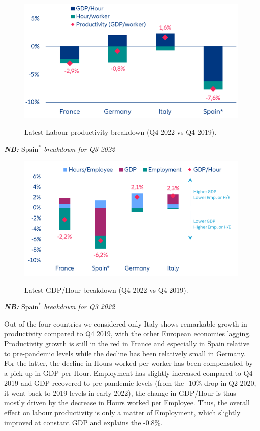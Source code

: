 \begin{figure}[H]
    \centering
    \caption{Latest Labour productivity breakdown (Q4 2022 vs Q4 2019).}
    \includegraphics[width=.5\textwidth]{Core/2.Labour/img/prodbreakdown1.png}
    \label{figure:prodbreakdown1}
\end{figure}
\vspace{-.5cm}
\quad \quad \quad \quad \quad \quad \quad \textit{\textbf{NB:} $\textrm{Spain}^{*}$ breakdown for Q3 2022}
\begin{figure}[H]
    \centering
    \caption{Latest GDP/Hour breakdown (Q4 2022 vs Q4 2019).}
    \includegraphics[width=.5\textwidth]{Core/2.Labour/img/prodbreakdown2.png}
    \label{figure:prodbreakdown2}
\end{figure}
\vspace{-.5cm}
\quad \quad \quad \quad \quad \quad \quad \textit{\textbf{NB:} $\textrm{Spain}^{*}$ breakdown for Q3 2022}

Out of the four countries we considered only Italy shows remarkable growth in productivity compared to Q4 2019, with the other European economies lagging. 
Productivity growth is still in the red in France and especially in Spain relative to pre-pandemic levels while the decline has been relatively small in Germany. 
For the latter, the decline in Hours worked per worker has been compensated by a pick-up in GDP per Hour. 
Employment has slightly increased compared to Q4 2019 and GDP recovered to pre-pandemic levels (from the -10\% drop in Q2 2020, it went back to 2019 levels in early 2022), the change in GDP/Hour is thus mostly driven by the decrease in Hours worked per Employee. 
Thus, the overall effect on labour productivity is only a matter of Employment, which slightly improved at constant GDP and explains the -0.8\%.

